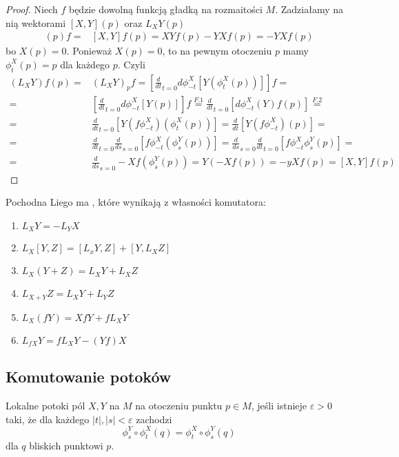 \begin{proof}
    Niech $f$ będzie dowolną funkcją gładką na rozmaitości $M$. Zadziałamy na nią wektorami $[X,Y](p)$ oraz $L_XY(p)$
    \begin{align*}
      [X,Y](p)f=&[X,Y]f(p)=XYf(p)-YXf(p)=-YXf(p)
    \end{align*}
    bo $X(p)=0$. Ponieważ $X(p)=0$, to na pewnym otoczeniu $p$ mamy $\phi_t^X(p)=p$ dla każdego $p$. Czyli
    \begin{align*}
      (L_XY)f(p)=&(L_XY)_pf=\left[\frac{d}{dt}_{t=0}d\phi_{-t}^X[Y(\phi_t^X(p))]\right]f=\\
      =&\left[\frac{d}{dt}_{t=0}d\phi_{-t}^X[Y(p)]\right]f\overset{F.1}{=}\frac{d}{dt}_{t=0}[d\phi_{-t}^X(Y)f(p)]\overset{F.2}{=}\\
      =&\frac{d}{dt}_{t=0}\left[Y(f\phi_{-t}^X)(\phi_t^X(p))\right]=\frac{d}{dt}[Y(f\phi_{-t}^X)(p)]=\\
      =&\frac{d}{dt}_{t=0}\frac{d}{ds}_{s=0}[f\phi_{-t}^X(\phi_s^Y(p))]=\frac{d}{ds}_{s=0}\frac{d}{dt}_{t=0}[f\phi_{-t}^X\phi_s^Y(p)]=\\
      =&\frac{d}{ds}_{s=0}-Xf(\phi_s^Y(p))=Y(-Xf(p))=-yXf(p)=[X,Y]f(p)
    \end{align*}
  
\end{proof}

Pochodna Liego ma , które wynikają z własności komutatora:
\begin{multicols}{2}
\begin{enumerate}
  \item $L_XY=-L_YX$
  \item $L_X[Y,Z]=[L_xY,Z]+[Y,L_XZ]$ %
  \item $L_X(Y+Z)=L_XY+L_XZ$%
  \item $L_{X+Y}Z=L_XY+L_YZ$
  \item $L_X(fY)=XfY+fL_XY$
  \item $L_{fX}Y=fL_XY-(Yf)X$
\end{enumerate}
\end{multicols}

\subsection{Komutowanie potoków}

\begin{definition}
  Lokalne potoki pól $X,Y$ na $M$  na otoczeniu punktu $p\in M$, jeśli istnieje $\varepsilon>0$ taki, że dla każdego $|t|,|s|<\varepsilon$ zachodzi
  $$\phi_s^Y\circ\phi_t^X(q)=\phi_t^X\circ\phi_s^Y(q)$$
  dla $q$ bliskich punktowi $p$.
\end{definition}

